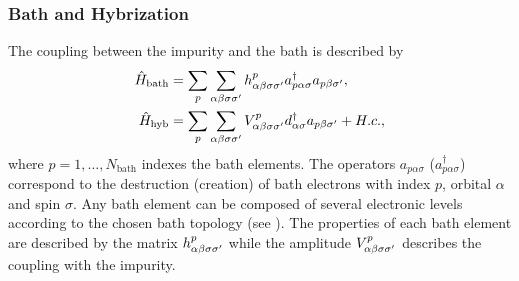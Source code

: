 \documentclass[edipack_sp.tex]{subfiles}
\begin{document}
\subsubsection{Bath and Hybrization}
The coupling between the impurity and the bath is described by
\begin{equation}\label{Hbath}
  \begin{split}
    \hat{H}_\mathrm{bath} &=
    \sum_p\sum_{\alpha\beta\sigma\sigma'}h^p_{\alpha\beta\sigma\sigma'}a^\dagger_{p\alpha\sigma}a_{p\beta\sigma'},\\
    \hat{H}_\mathrm{hyb} &= \sum_p\sum_{\alpha\beta\sigma\sigma'}V^p_{\alpha\beta\sigma\sigma'}d^\dagger_{\alpha\sigma}a_{p\beta\sigma'}+H.c., \\
\end{split}
\end{equation}
where $p=1,\dots,N_\mathrm{bath}$ indexes the
bath elements. The operators $a_{p\alpha\sigma}$
($a^\dagger_{p\alpha\sigma}$) correspond to the destruction (creation) of
bath electrons with index $p$, orbital $\alpha$ and spin $\sigma$.
Any bath element can be composed of several electronic levels
according to the chosen bath topology (see ). The  properties of each bath element are described by the
matrix $h^p_{\alpha\beta\sigma\sigma'}$ while the amplitude
$V^p_{\alpha\beta\sigma\sigma'}$ describes the coupling with the impurity.   
\end{document}
